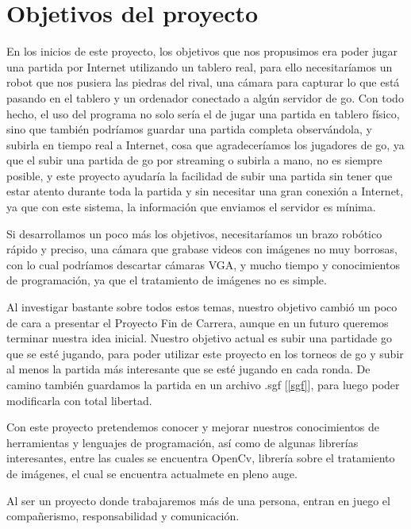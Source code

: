 \documentclass[12pt,a4paper]{report}
\begin{document}
\section{Objetivos del proyecto} 

En los inicios de este proyecto, los objetivos que nos propusimos era poder
jugar una partida por Internet utilizando un tablero real, para ello
necesitaríamos un robot que nos pusiera las piedras del rival, una cámara para
capturar lo que está pasando en el tablero y un ordenador conectado a algún
servidor de go. Con todo hecho, el uso del programa no solo sería el de jugar
una partida en tablero físico, sino que también podríamos guardar una partida
completa observándola, y subirla en tiempo real a Internet, cosa que
agradeceríamos los jugadores de go, ya que el subir una partida de go por
streaming o subirla a mano, no es siempre posible, y este proyecto ayudaría la
facilidad de subir una partida sin tener que estar atento durante toda la
partida y sin necesitar una gran conexión a Internet, ya que con este sistema,
la información que enviamos el servidor es mínima. 

Si desarrollamos un poco más los objetivos, necesitaríamos un brazo robótico
rápido y preciso, una cámara que grabase videos con imágenes no muy borrosas,
con lo cual podríamos descartar cámaras VGA, y mucho tiempo y conocimientos de
programación, ya que el tratamiento de imágenes no es simple. 

Al investigar bastante sobre todos estos temas, nuestro objetivo cambió un poco
de cara a presentar el Proyecto Fin de Carrera, aunque en un futuro queremos
terminar nuestra idea inicial. Nuestro objetivo actual es subir una partidade go
que se esté jugando, para poder utilizar este proyecto en los torneos de go y
subir al menos la partida más interesante que se esté jugando en cada ronda. De
camino también guardamos la partida en un archivo .sgf [\ref{sgf}], para luego
poder modificarla con total libertad. 

Con este proyecto pretendemos conocer y mejorar nuestros conocimientos de 
herramientas y lenguajes de programación, así como de algunas librerías
interesantes, entre las cuales se encuentra OpenCv, librería sobre el
tratamiento de imágenes, el cual se encuentra actualmete en pleno auge. 

Al ser un proyecto donde trabajaremos más de una persona, entran en juego el
compañerismo, responsabilidad y comunicación. 
\end{document}
